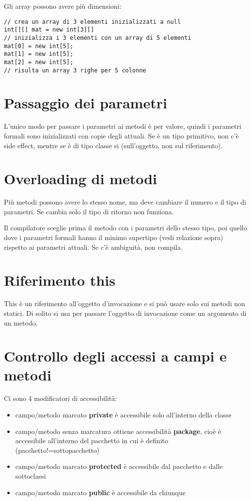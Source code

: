 Gli array possono avere più dimensioni:

\begin{lstlisting}
// crea un array di 3 elementi inizializzati a null
int[][] mat = new int[3][] 
// inizializza i 3 elementi con un array di 5 elementi
mat[0] = new int[5]; 
mat[1] = new int[5];
mat[2] = new int[5];
// risulta un array 3 righe per 5 colonne
\end{lstlisting}

\section{Passaggio dei parametri}
L'unico modo per passare i parametri ai metodi è per valore, quindi i parametri formali sono inizializzati con copie degli attuali. Se è un tipo primitivo, non c'è side effect, mentre se è di tipo classe si (sull'oggetto, non sul riferimento).

\section{Overloading di metodi}
Più metodi possono avere lo stesso nome, ma deve cambiare il numero e il tipo di parametri. Se cambia solo il tipo di ritorno non funziona.

Il compilatore sceglie prima il metodo con i parametri dello stesso tipo, poi quello dove i parametri formali hanno il minimo supertipo (vedi relazione sopra) rispetto ai parametri attuali.
Se c'è ambiguità, non compila.

\section{Riferimento this}
This è un riferimento all'oggetto d'invocazione e si può usare solo sui metodi non statici. Di solito si usa per passare l'oggetto di
invocazione come un argomento di un metodo.

\section{Controllo degli accessi a campi e metodi}
Ci sono 4 modificatori di accessibilità:
\begin{itemize}
\item campo/metodo marcato \textbf{private} è accessibile solo all'interno della classe
\item campo/metodo senza marcatura ottiene accessibilità \textbf{package}, cioè è accessibile all'interno del pacchetto in cui è definito (pacchetto!=sottopacchetto)
\item campo/metodo marcato \textbf{protected} è accessibile dal pacchetto e dalle sottoclassi
\item campo/metodo marcato \textbf{public} è accessibile da chiunque
\end{itemize}

